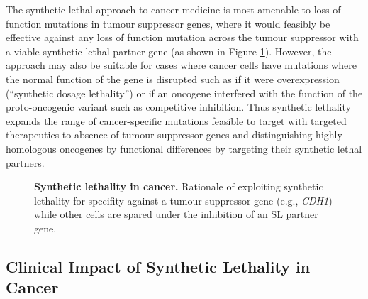 The synthetic lethal approach to cancer medicine is most amenable to loss of function mutations in tumour suppressor genes, where it would feasibly be effective against any loss of function mutation across the tumour suppressor with a viable synthetic lethal partner gene (as shown in Figure \ref{fig:SL_Concept}). However, the approach may also be suitable for cases where cancer cells have mutations where the normal function of the gene is disrupted such as if it were overexpression (``synthetic dosage lethality'') or if an oncogene interfered with the function of the proto-oncogenic variant such as competitive inhibition. Thus synthetic lethality expands the range of cancer-specific mutations feasible to target with targeted therapeutics to absence of tumour suppressor genes and distinguishing highly homologous oncogenes by functional differences by targeting their synthetic lethal partners. 

\begin{figure}[!ht]
   \centering
      \caption[Synthetic lethality in cancer]{\textbf{Synthetic lethality in cancer.} Rationale of exploiting synthetic lethality for specifity against a tumour suppressor gene (e.g.,  \textit{CDH1}) while other cells are spared under the inhibition of an SL partner gene.}
\label{fig:SL_Concept}
\end{figure}

\subsection{Clinical Impact of Synthetic Lethality in Cancer}

